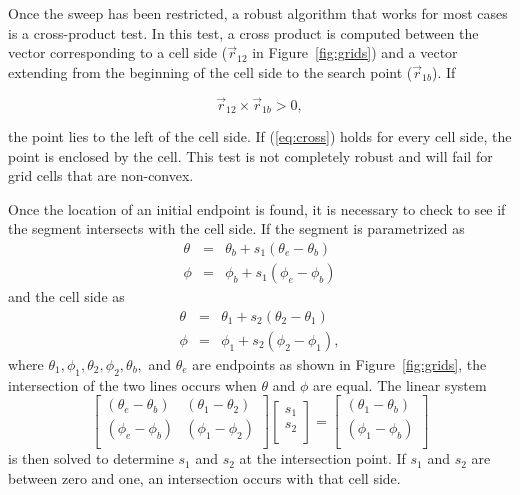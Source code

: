      Once the sweep has been restricted, a robust algorithm that works for most
     cases is a cross-product test.  In this test, a cross product is computed
     between the vector corresponding to a cell side ($\vec{r}_{12}$ in
     Figure~\ref{fig:grids}) and a vector extending from the beginning of the
     cell side to the search point ($\vec{r}_{1b}$).  If 

\begin{equation}\label{eq:cross}
\vec{r}_{12} \times \vec{r}_{1b} > 0,
\end{equation}

     the point lies to the left of the cell side.  If (\ref{eq:cross}) holds for
     every cell side, the point is enclosed by the cell.  This test is not
     completely robust and will fail for grid cells that are non-convex.


     Once the location of an initial endpoint is found, it is necessary to check
     to see if the segment intersects with the cell side.  If the segment is
     parametrized as
\begin{eqnarray}
\theta &=& \theta_b + s_1 (\theta_e - \theta_b) \nonumber \\
\phi   &=& \phi_b + s_1 (\phi_e - \phi_b) 
\end{eqnarray}
     and the cell side as
\begin{eqnarray}
\theta &=& \theta_1 + s_2 (\theta_2 - \theta_1) \nonumber \\
\phi   &=& \phi_1 + s_2 (\phi_2 - \phi_1),
\end{eqnarray}
     where $\theta_1, \phi_1, \theta_2, \phi_2, \theta_b,$ and $\theta_e$ are
     endpoints as shown in Figure~\ref{fig:grids}, the intersection of the two
     lines occurs when $\theta$ and $\phi$ are equal.  The linear system 
\begin{equation}
\left[ \begin{array}{cc} 
(\theta_e - \theta_b) & (\theta_1 - \theta_2) \\
(\phi_e - \phi_b) & (\phi_1 - \phi_2) \\
\end{array} \right]
\left[ \begin{array}{c} s_1 \\ s_2 \\ \end{array} \right] = 
\left[ \begin{array}{c} 
(\theta_1 - \theta_b) \\ (\phi_1 - \phi_b)  \\
\end{array} \right]
\end{equation}
     is then solved to determine $s_1$ and $s_2$ at the intersection point.  If
     $s_1$ and $s_2$ are between zero and one, an intersection occurs with that
     cell side. 

